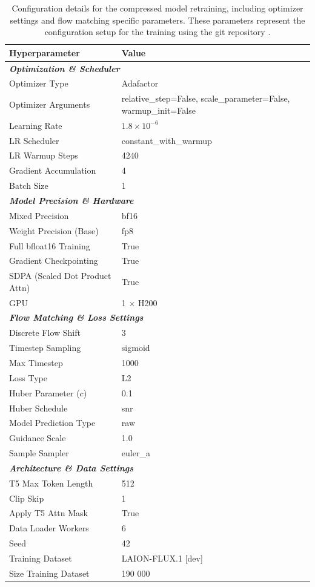 \begin{table}[H]
	\centering
	\caption[FLUX.1 {[dev]} Fine-Tuning Hyperparameters]{Configuration details for the compressed model retraining, including optimizer settings and flow matching specific parameters. These parameters represent the configuration setup for the training using the git repository \cite{kohya_ss_sd_scripts_2024}.}
	\label{tab:flux_training_config}
	\begin{tabular}{l l}
		\toprule
		\textbf{Hyperparameter} & \textbf{Value} \\
		\midrule
		\multicolumn{2}{l}{\textit{\textbf{Optimization \& Scheduler}}} \\
		Optimizer Type & Adafactor \\
		Optimizer Arguments & \small{relative\_step=False, scale\_parameter=False, warmup\_init=False} \\
		Learning Rate & $1.8 \times 10^{-6}$ \\
		LR Scheduler & constant\_with\_warmup \\
		LR Warmup Steps & 4240 \\
		Gradient Accumulation & 4 \\
		Batch Size & 1 \\
		\midrule
		\multicolumn{2}{l}{\textit{\textbf{Model Precision \& Hardware}}} \\
		Mixed Precision & bf16 \\
		Weight Precision (Base) & fp8 \\
		Full bfloat16 Training & True \\
		Gradient Checkpointing & True \\
		SDPA (Scaled Dot Product Attn) & True \\
		GPU & 1 $\times$ H200 \\
		\midrule
		\multicolumn{2}{l}{\textit{\textbf{Flow Matching \& Loss Settings}}} \\
		Discrete Flow Shift & 3 \\
		Timestep Sampling & sigmoid \\
		Max Timestep & 1000 \\
		Loss Type & L2 \\
		Huber Parameter ($c$) & 0.1 \\
		Huber Schedule & snr \\
		Model Prediction Type & raw \\
		Guidance Scale & 1.0 \\
		Sample Sampler & euler\_a \\
		\midrule
		\multicolumn{2}{l}{\textit{\textbf{Architecture \& Data Settings}}} \\
		T5 Max Token Length & 512 \\
		Clip Skip & 1 \\
		Apply T5 Attn Mask & True \\
		Data Loader Workers & 6 \\
		Seed & 42 \\
		Training Dataset & LAION-FLUX.1 {[dev]}\\
		Size Training Dataset & 190 000 \\
		\bottomrule
	\end{tabular}
\end{table}


